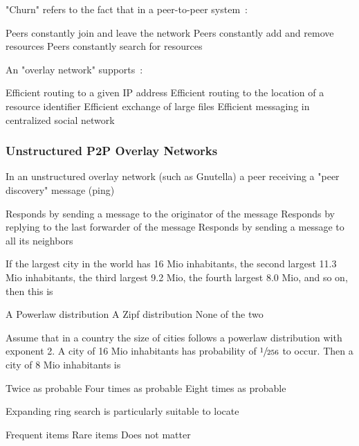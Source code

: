 \documentclass[12pt,a4paper]{exam} %
\begin{document}
\begin{flushleft}
\begin{multicols*}{2}
\begin{questions}
\question "Churn" refers to the fact that in a peer-to-peer system~:
\begin{checkboxes}
\CorrectChoice Peers constantly join and leave the network
\choice Peers constantly add and remove resources
\choice Peers constantly search for resources
\end{checkboxes}

\question An "overlay network" supports~:
\begin{checkboxes}
\choice Efficient routing to a given IP address
\CorrectChoice Efficient routing to the location of a resource identifier
\choice Efficient exchange of large files
\choice Efficient messaging in centralized social network
\end{checkboxes}


\subsubsection{Unstructured P2P Overlay Networks}

\question In an unstructured overlay network (such as Gnutella) a peer receiving a "peer discovery" message (ping)
\begin{checkboxes}
\choice Responds by sending a message to the originator of the message
\CorrectChoice Responds by replying to the last forwarder of the message
\choice Responds by sending a message to all its neighbors
\end{checkboxes}

\question If the largest city in the world has 16 Mio inhabitants, the second largest 11.3 Mio inhabitants, the third largest 9.2 Mio, the fourth largest 8.0 Mio, and so on, then this is
\begin{checkboxes}
\choice A Powerlaw distribution
\CorrectChoice A Zipf distribution
\choice None of the two
\end{checkboxes}

\question Assume that in a country the size of cities follows a powerlaw distribution with exponent 2. A city of 16 Mio inhabitants has probability of $\sfrac{1}{256}$ to occur. Then a city of 8 Mio inhabitants is
\begin{checkboxes}
\choice Twice as probable
\CorrectChoice Four times as probable
\choice Eight times as probable
\end{checkboxes}

\question Expanding ring search is particularly suitable to locate
\begin{checkboxes}
\CorrectChoice Frequent items
\choice Rare items
\choice Does not matter
\end{checkboxes}


\end{questions}
\end{multicols*}
\end{flushleft}
\end{document}
